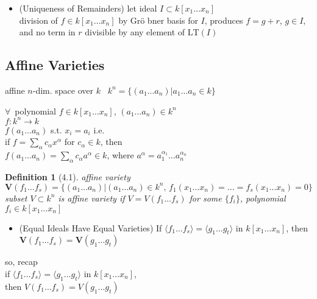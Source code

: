 \documentclass[10pt]{amsart}
\newtheorem{definition}{Definition}
\begin{document}
\begin{multicols*}{2}
\begin{itemize}
\item (Uniqueness of Remainders) let ideal $I\subset k[x_1 \dots x_n]$ \\
division of $f\in k[x_1 \dots x_n]$ by Gr\"o bner basis for $I$, produces $f=g+r$, $g\in I$, and no term in $r$ divisible by any element of $\text{LT}(I)$
\end{itemize}





\subsection{Affine Varieties}

affine $n$-dim. space over $k$ \quad \, $k^n = \lbrace (a_1 \dots a_n ) | a_1 \dots a_n \in k \rbrace$

$\forall \, $ polynomial $f\in k[x_1 \dots x_n ]$, $(a_1 \dots a_n) \in k^n$ \\
\phantom{ \quad } $f: k^n \to k$ \\
\phantom{ \quad } $f(a_1 \dots a_n)$ s.t. $x_i = a_i$ i.e. \\

if $f= \sum_{\alpha} c_{\alpha} x^{\alpha}$ for $c_{\alpha} \in k$, then  \\
\phantom{ \quad } $f(a_1 \dots a_n) =\sum_{\alpha} c_{\alpha}a^{\alpha} \in k$, where $a^{\alpha} = a_1^{\alpha_1} \dots a_n^{\alpha_n}$

\begin{definition}[4.1]
affine variety $\mathbf{V}(f_1 \dots f_s) = \lbrace ( a_1 \dots a_n) | (a_1 \dots a_n) \in k^n, \, f_1(x_1 \dots x_n) = \dots = f_s(x_1 \dots x_n) = 0 \rbrace$ \\
subset $V\subset k^n$ is affine variety if $V = V(f_1 \dots f_s)$ for some $\lbrace f_i \rbrace$, polynomial $f_i \in k[x_1 \dots x_n]$
\end{definition}

\begin{itemize}
  \item (Equal Ideals Have Equal Varieties) If $\langle f_1 \dots f_s \rangle = \langle g_1 \dots g_t \rangle$ in $k[x_1 \dots x_n]$, then $\mathbf{V}(f_1 \dots f_s) = \mathbf{V}(g_1 \dots g_t)$
\end{itemize}

so, recap \\
if $\langle f_1 \dots f_s \rangle = \langle g_1 \dots g_t \rangle $ in $k[x_1 \dots x_n]$, \\
then $V(f_1 \dots f_s) = V(g_1 \dots g_t)$   \\


\end{multicols*}
\end{document}
